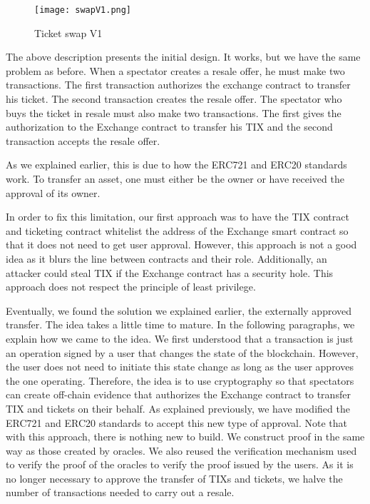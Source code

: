 \documentclass[a4paper,11pt,oneside]{report}
\begin{document}
\begin{figure}[h!]
  \texttt{[image: swapV1.png]}
  \caption{Ticket swap V1}
  \label{fig:swapV1}
\end{figure}

The above description presents the initial design. It works, but we have the same problem as before. When a spectator creates a resale offer, he must make two transactions. The first transaction authorizes the exchange contract to transfer his ticket. The second transaction creates the resale offer. The spectator who buys the ticket in resale must also make two transactions. The first gives the authorization to the Exchange contract to transfer his TIX and the second transaction accepts the resale offer.

As we explained earlier, this is due to how the ERC721 and ERC20 standards work. To transfer an asset, one must either be the owner or have received the approval of its owner.

In order to fix this limitation, our first approach was to have the TIX contract and ticketing contract whitelist the address of the Exchange smart contract so that it does not need to get user approval. However, this approach is not a good idea as it blurs the line between contracts and their role. Additionally, an attacker could steal TIX if the Exchange contract has a security hole. This approach does not respect the principle of least privilege.

Eventually, we found the solution we explained earlier, the externally approved transfer. The idea takes a little time to mature. In the following paragraphs, we explain how we came to the idea. We first understood that a transaction is just an operation signed by a user that changes the state of the blockchain. However, the user does not need to initiate this state change as long as the user approves the one operating. Therefore, the idea is to use cryptography so that spectators can create off-chain evidence that authorizes the Exchange contract to transfer TIX and tickets on their behalf. As explained previously, we have modified the ERC721 and ERC20 standards to accept this new type of approval. Note that with this approach, there is nothing new to build. We construct proof in the same way as those created by oracles. We also reused the verification mechanism used to verify the proof of the oracles to verify the proof issued by the users. As it is no longer necessary to approve the transfer of TIXs and tickets, we halve the number of transactions needed to carry out a resale.
\end{document}
